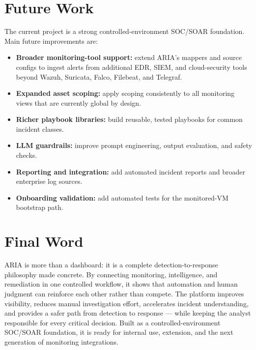 \section*{Future Work}

The current project is a strong controlled-environment SOC/SOAR foundation. Main future improvements are:

\begin{itemize}[leftmargin=1cm]
\item \textbf{Broader monitoring-tool support:} extend ARIA's mappers and source configs to ingest alerts from additional EDR, SIEM, and cloud-security tools beyond Wazuh, Suricata, Falco, Filebeat, and Telegraf.
\item \textbf{Expanded asset scoping:} apply scoping consistently to all monitoring views that are currently global by design.
\item \textbf{Richer playbook libraries:} build reusable, tested playbooks for common incident classes.
\item \textbf{LLM guardrails:} improve prompt engineering, output evaluation, and safety checks.
\item \textbf{Reporting and integration:} add automated incident reports and broader enterprise log sources.
\item \textbf{Onboarding validation:} add automated tests for the monitored-VM bootstrap path.
\end{itemize}

\section*{Final Word}

ARIA is more than a dashboard: it is a complete detection-to-response philosophy made concrete. By connecting monitoring, intelligence, and remediation in one controlled workflow, it shows that automation and human judgment can reinforce each other rather than compete. The platform improves visibility, reduces manual investigation effort, accelerates incident understanding, and provides a safer path from detection to response --- while keeping the analyst responsible for every critical decision. Built as a controlled-environment SOC/SOAR foundation, it is ready for internal use, extension, and the next generation of monitoring integrations.
